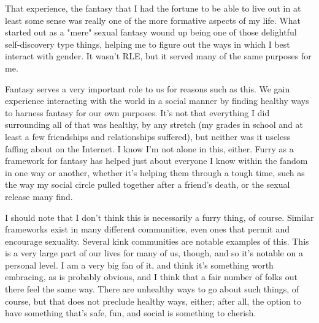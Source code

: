 That experience, the fantasy that I had the fortune to be able to live out in at least some sense was really one of the more formative aspects of my life. What started out as a "mere" sexual fantasy wound up being one of those delightful self-discovery type things, helping me to figure out the ways in which I best interact with gender. It wasn't RLE, but it served many of the same purposes for me.

Fantasy serves a very important role to us for reasons such as this. We gain experience interacting with the world in a social manner by finding healthy ways to harness fantasy for our own purposes. It's not that everything I did surrounding all of that was healthy, by any stretch (my grades in school and at least a few friendships and relationships suffered), but neither was it useless faffing about on the Internet. I know I'm not alone in this, either. Furry as a framework for fantasy has helped just about everyone I know within the fandom in one way or another, whether it's helping them through a tough time, such as the way my social circle pulled together after a friend's death, or the sexual release many find.

I should note that I don't think this is necessarily a furry thing, of course. Similar frameworks exist in many different communities, even ones that permit and encourage sexuality. Several kink communities are notable examples of this. This is a very large part of our lives for many of us, though, and so it's notable on a personal level. I am a very big fan of it, and think it's something worth embracing, as is probably obvious, and I think that a fair number of folks out there feel the same way. There are unhealthy ways to go about such things, of course, but that does not preclude healthy ways, either; after all, the option to have something that's safe, fun, and social is something to cherish.
